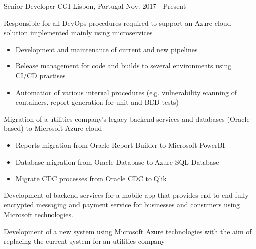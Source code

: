 


\begin{cventries}


\cventry
{Senior Developer}
{CGI}
{Lisbon, Portugal}
{Nov. 2017 - Present}
{
    \begin{cvitems}
        \item {Responsible for all DevOps procedures required to support an Azure cloud solution implemented mainly using microservices}
        \begin{itemize}
            \item {Development and maintenance of current and new pipelines}
            \item {Release management for code and builds to several environments using CI/CD practises}
            \item {Automation of various internal procedures (e.g. vulnerability scanning of containers, report generation for unit and BDD tests)}
        \end{itemize}
        \item {Migration of a utilities company's legacy backend services and databases (Oracle based) to Microsoft Azure cloud}
        \begin{itemize}
            \item {Reports migration from Oracle Report Builder to Microsoft PowerBI}
            \item {Database migration from Oracle Database to Azure SQL Database}
            \item {Migrate CDC processes from Oracle CDC to Qlik}
        \end{itemize}
        \item {Development of backend services for a mobile app that provides end-to-end fully encrypted messaging and payment service for businesses and consumers using Microsoft technologies.}
        \item {Development of a new system using Microsoft Azure technologies with the aim of replacing the current system for an utilities company}

\end{cvitems}}
\end{cventries}
